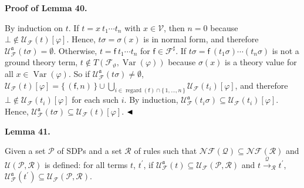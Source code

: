 \par\medskip\noindent\textbf{Proof of Lemma 40.}\par
 
 
By induction on $t$. If $t={x}\ {{t}_{1}\cdots{t}_{n}}$ with $x\in\mathcal{V}$, then $n=0$ because $\bot\notin\mathcal{U}_{\mathcal{F}}(t)[\varphi]$. Hence, $t\sigma=\sigma(x)$ is in normal form, and therefore $\mathcal{U}_{\mathcal{F}}^{\mathfrak{a}}(t\sigma)=\emptyset$. Otherwise, $t={\mathsf{f}}\ {{t}_{1}\cdots{t}_{n}}$ for $\mathsf{f}\in\mathcal{F}^{\sharp}$. If $t\sigma={\mathsf{f}}\ {(t_{1}\sigma)\cdots(t_{n}\sigma)}$ is not a ground theory term, $t\notin T({\mathcal{F}}_{\vartheta},\operatorname{Var}(\varphi))$ because $\sigma(x)$ is a theory value for all $x\in\operatorname{Var}(\varphi)$. So if $\mathcal{U}_{\mathcal{F}}^{\mathfrak{a}}(t\sigma)\neq\emptyset$, $\mathcal{U}_{\mathcal{F}}(t)[\varphi]=\{\,(\mathsf{f},n)\,\}\cup\bigcup_{i\in\operatorname{regard}(\mathsf{f})\cap\{\,1,\ldots,n\,\}}\mathcal{U}_{\mathcal{F}}(t_{i})[\varphi]$, and therefore $\bot\notin\mathcal{U}_{\mathcal{F}}(t_{i})[\varphi]$ for each such $i$. By induction, $\mathcal{U}_{\mathcal{F}}^{\mathfrak{a}}(t_{i}\sigma)\subseteq\mathcal{U}_{\mathcal{F}}(t_{i})[\varphi]$. Hence, $\mathcal{U}_{\mathcal{F}}^{\mathfrak{a}}(t\sigma)\subseteq\mathcal{U}_{\mathcal{F}}(t)[\varphi]$. $\hfill\blacktriangleleft$\par
 
 
 
\par\medskip\noindent\textbf{Lemma 41.}\par
 
 
Given a set $\mathcal{P}$ of SDPs and a set $\mathcal{R}$ of rules such that $\mathcal{N}\!\mathcal{F}(\mathcal{Q})\subseteq\mathcal{N}\!\mathcal{F}(\mathcal{R})$ and $\mathcal{U}(\mathcal{P},\mathcal{R})$ is defined: for all terms $t$, $t^{\prime}$, if $\mathcal{U}_{\mathcal{F}}^{\mathfrak{a}}(t)\subseteq\mathcal{U}_{\mathcal{F}}(\mathcal{P},\mathcal{R})$ and $t\xrightarrow{\scriptscriptstyle\mathcal{Q}}_{\mathcal{R}}t^{\prime}$, $\mathcal{U}_{\mathcal{F}}^{\mathfrak{a}}(t^{\prime})\subseteq\mathcal{U}_{\mathcal{F}}(\mathcal{P},\mathcal{R})$.\par
 
 
 

